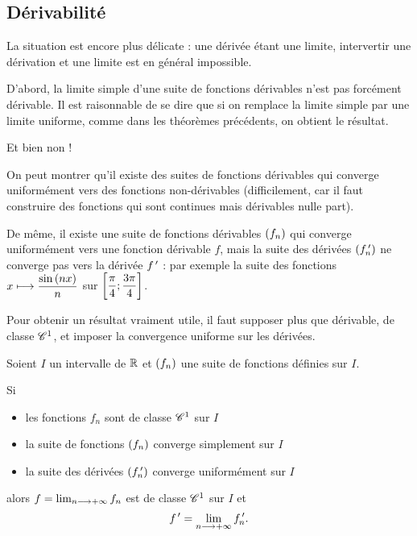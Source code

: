 \subsection{Dérivabilité}

La situation est encore plus délicate : une dérivée étant une limite, intervertir une dérivation et une limite est en général impossible.

D'abord, la limite simple d'une suite de fonctions dérivables n'est pas forcément dérivable. Il est raisonnable de se dire que si on remplace la limite simple par une limite uniforme, comme dans les théorèmes précédents, on obtient le résultat.

Et bien non !

On peut montrer qu'il existe des suites de fonctions dérivables qui converge uniformément vers des fonctions non-dérivables (difficilement, car il faut construire des fonctions qui sont continues mais dérivables nulle part).

De même, il existe une suite de fonctions dérivables \(\left(f_n\right)\) qui converge uniformément vers une fonction dérivable \(f\), mais la suite des dérivées \(\left(f_n^{\,\prime}\right)\) ne converge pas vers la dérivée \(f^{\,\prime}\) : par exemple la suite des fonctions \(x\longmapsto\dfrac{\sin\left(nx\right)}{n}\) sur \(\left[\dfrac{\pi}{4};\dfrac{3\pi}{4}\right]\).

Pour obtenir un résultat vraiment utile, il faut supposer plus que dérivable, \ie de classe \(\mathscr{C}^{1}\), et imposer la convergence uniforme sur les dérivées.

\begin{theo}
Soient \(I\) un intervalle de \(\mathbb{R}\) et \(\left(f_n\right)\) une suite de fonctions définies sur \(I\).

Si

\begin{itemize}
    \item les fonctions \(f_n\) sont de classe \(\mathscr{C}^{1}\) sur \(I\) \\
    \item la suite de fonctions \(\left(f_n\right)\) converge simplement sur \(I\) \\
    \item la suite des dérivées \(\left(f_n^{\,\prime}\right)\) converge uniformément sur \(I\)
\end{itemize}

alors \(f=\lim_{n\longrightarrow+\infty}f_n\) est de classe \(\mathscr{C}^{1}\) sur \(I\) et \[f^{\,\prime}=\lim_{n\longrightarrow+\infty}f_n^{\,\prime}.\]
\end{theo}

